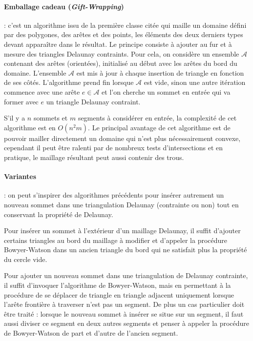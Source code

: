 \documentclass[12pt,a4paper]{report}
\begin{document}
\paragraph{\indent Emballage cadeau (\emph{Gift-Wrapping})} : c'est un algorithme issu de la première classe citée qui maille un domaine défini par des polygones, des arêtes et des points, les éléments des deux derniers types devant apparaître dans le résultat. Le principe consiste à ajouter au fur et à mesure des triangles Delaunay contraints. Pour cela, on considère un ensemble $\mathcal{A}$ contenant des arêtes (orientées), initialisé au début avec les arêtes du bord du domaine. L'ensemble $\mathcal{A}$ est mis à jour à chaque insertion de triangle en fonction de ses côtés. L'algorithme prend fin lorsque $\mathcal{A}$ est vide, sinon une autre itération commence avec une arête $e\in\mathcal{A}$ et l'on cherche un sommet en entrée qui va former avec $e$ un triangle Delaunay contraint.

S'il y a $n$ sommets et $m$ segments à considérer en entrée, la complexité de cet algorithme est en $O(n^{2}m)$. Le principal avantage de cet algorithme est de pouvoir mailler directement un domaine qui n'est plus nécessairement convexe, cependant il peut être ralenti par de nombreux tests d'intersections et en pratique, le maillage résultant peut aussi contenir des trous.

\paragraph{Variantes} : on peut s'inspirer des algorithmes précédents pour insérer autrement un nouveau sommet dans une triangulation Delaunay (contrainte ou non) tout en conservant la propriété de Delaunay.

Pour insérer un sommet à l'extérieur d'un maillage Delaunay, il suffit d'ajouter certains triangles au bord du maillage à modifier et d'appeler la procédure Bowyer-Watson dans un ancien triangle du bord qui ne satisfait plus la propriété du cercle vide.

Pour ajouter un nouveau sommet dans une triangulation de Delaunay contrainte, il suffit d'invoquer l'algorithme de Bowyer-Watson, mais en permettant à la procédure de se déplacer de triangle en triangle adjacent uniquement lorsque l'arête frontière à traverser n'est pas un segment. De plus un cas particulier doit être traité : lorsque le nouveau sommet à insérer se situe sur un segment, il faut aussi diviser ce segment en deux autres segments et penser à appeler la procédure de Bowyer-Watson de part et d'autre de l'ancien segment.
\end{document}

